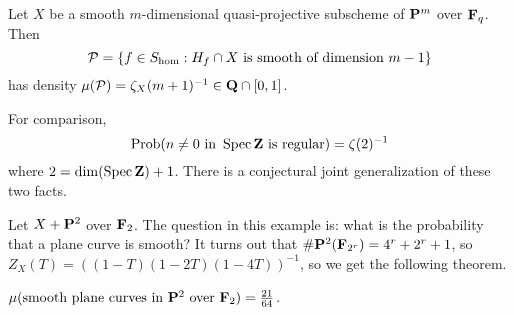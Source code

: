 \begin{theorem}
Let $X$ be a smooth $m$-dimensional quasi-projective subscheme of 
$\mathbf{P}^m$ over $\mathbf{F}_q$. Then 
\[
  \mathcal{P}=\{f\in S_{\hom}:H_f\cap X\text{ is smooth of dimension $m-1$}\} 
\]
has density $\mu(\mathcal{P}) = \zeta_X(m+1)^{-1}\in \mathbf{Q}\cap [0,1]$. 
\end{theorem}

For comparison, 
\[
  \operatorname{Prob}(n\ne 0\text{ in }\operatorname{Spec}\mathbf{Z}\text{ is regular}) = \zeta(2)^{-1} 
\]
where $2=\dim(\operatorname{Spec}\mathbf{Z})+1$. There is a conjectural joint generalization of 
these two facts. 

\begin{example}
Let $X+\mathbf{P}^2$ over $\mathbf{F}_2$. The question in this example is: what is the 
probability that a plane curve is smooth? It turns out that 
$\#\mathbf{P}^2(\mathbf{F}_{2^r}) = 4^r+2^r+1$, so 
$Z_X(T) = \left((1-T)(1-2 T)(1-4 T)\right)^{-1}$, so we get the following 
theorem. 
\end{example}

\begin{theorem}
$\mu(\text{smooth plane curves in $\mathbf{P}^2$ over $\mathbf{F}_2$}) = \frac{21}{64}$. 
\end{theorem}

